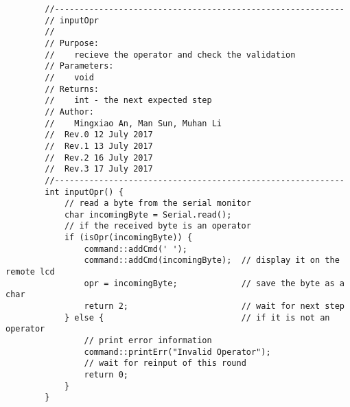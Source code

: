 \begin{verbatim}
        //-----------------------------------------------------------  
        // inputOpr 
        //  
        // Purpose:  
        //    recieve the operator and check the validation
        // Parameters:  
        //    void 
        // Returns:  
        //    int - the next expected step   
        // Author:  
        //    Mingxiao An, Man Sun, Muhan Li
        //  Rev.0 12 July 2017
        //  Rev.1 13 July 2017
        //  Rev.2 16 July 2017
        //  Rev.3 17 July 2017
        //-----------------------------------------------------------
        int inputOpr() {
            // read a byte from the serial monitor
            char incomingByte = Serial.read();
            // if the received byte is an operator
            if (isOpr(incomingByte)) {
                command::addCmd(' ');
                command::addCmd(incomingByte);  // display it on the remote lcd
                opr = incomingByte;             // save the byte as a char
                return 2;                       // wait for next step
            } else {                            // if it is not an operator
                // print error information
                command::printErr("Invalid Operator");
                // wait for reinput of this round
                return 0;
            }
        }


\end{verbatim}
